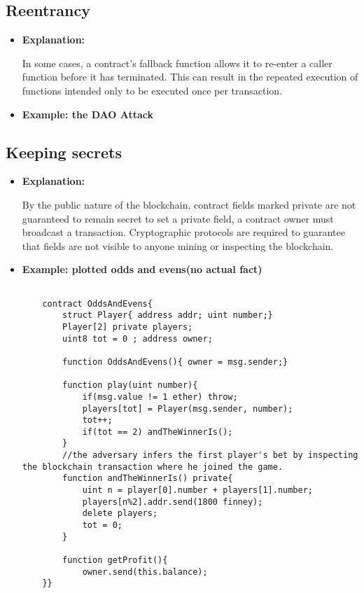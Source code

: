 \documentclass{llncs}
\begin{document}
\subsection{Reentrancy}
\begin{itemize}
\item \textbf{Explanation:} 

In some cases, a contract’s fallback function allows it to re-enter a caller function before it has terminated. This can result in the repeated execution of functions intended only to be executed once per transaction.
\item \textbf{Example: the DAO Attack}

\end{itemize}

\subsection{Keeping secrets}
\begin{itemize}
\item \textbf{Explanation:} 

By the public nature of the blockchain, contract fields marked private are not guaranteed to remain secret to set a private field, a contract owner must broadcast a transaction. Cryptographic protocols are required to guarantee that fields are not visible to anyone mining or inspecting the blockchain.
\item \textbf{Example: plotted odds and evens(no actual fact)}

	\begin{minipage}{.5\textwidth} 
	{\scriptsize
	\begin{verbatim}
	
	contract OddsAndEvens{
	    struct Player{ address addr; uint number;}
	    Player[2] private players;
	    uint8 tot = 0 ; address owner;
	    
	    function OddsAndEvens(){ owner = msg.sender;}
	    
	    function play(uint number){
	        if(msg.value != 1 ether) throw;
	        players[tot] = Player(msg.sender, number);
	        tot++;
	        if(tot == 2) andTheWinnerIs();
	    }
	    //the adversary infers the first player's bet by inspecting the blockchain transaction where he joined the game.
	    function andTheWinnerIs() private{
	        uint n = player[0].number + players[1].number;
	        players[n%2].addr.send(1800 finney);
	        delete players;
	        tot = 0;
	    }
	    
	    function getProfit(){
	        owner.send(this.balance);
	}}

	\end{verbatim} }
	\end{minipage}	

\end{itemize}
\end{document}
